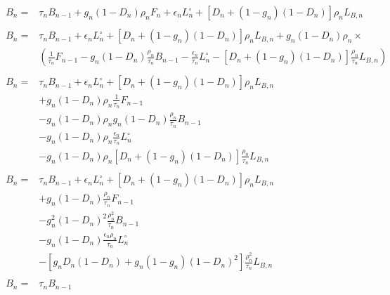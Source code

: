 \documentclass[11pt,a4paper]{article}
\begin{document}
\begin{align}
\begin{split}
	B_n = & \tau_n B_{n-1} + g_n \left(1 - D_n\right) \rho_n F_n + \epsilon_n L^\circ_n + \left[D_n + \left(1 - g_n\right)\left(1 - D_n\right)\right] \rho_n L_{B,n}
\end{split}\\
\begin{split}
	B_n = & \tau_n B_{n-1} + \epsilon_n L^\circ_n + \left[D_n + \left(1 - g_n\right)\left(1 - D_n\right)\right] \rho_n L_{B,n} + g_n \left(1 - D_n\right) \rho_n \times \\ &\left(\frac{1}{\tau_n} F_{n-1} - g_n \left(1 - D_n\right) \frac{\rho_n}{\tau_n} B_{n-1} - \frac{\epsilon_n}{\tau_n} L^\circ_n - \left[D_n + \left(1 - g_n\right)\left(1 - D_n\right)\right] \frac{\rho_n}{\tau_n} L_{B,n}\right)
\end{split}\\
\begin{split}
	B_n = & 
		\tau_n B_{n-1}
		+ \epsilon_n L^\circ_n
		+ \left[D_n + \left(1 - g_n\right)\left(1 - D_n\right)\right] \rho_n L_{B,n} \\&
		+ g_n \left(1 - D_n\right) \rho_n \frac{1}{\tau_n} F_{n-1} \\&
		- g_n \left(1 - D_n\right) \rho_n g_n \left(1 - D_n\right) \frac{\rho_n}{\tau_n} B_{n-1} \\&
		- g_n \left(1 - D_n\right) \rho_n \frac{\epsilon_n}{\tau_n} L^\circ_n \\&
		- g_n \left(1 - D_n\right) \rho_n \left[D_n + \left(1 - g_n\right)\left(1 - D_n\right)\right] \frac{\rho_n}{\tau_n} L_{B,n}
\end{split}\\
\begin{split}
	B_n = & 
		\tau_n B_{n-1}
		+ \epsilon_n L^\circ_n
		+ \left[D_n + \left(1 - g_n\right)\left(1 - D_n\right)\right] \rho_n L_{B,n} \\&
		+ g_n \left(1 - D_n\right) \frac{\rho_n}{\tau_n} F_{n-1} \\&
		- g_n^2 \left(1 - D_n\right)^2 \frac{\rho_n^2}{\tau_n} B_{n-1} \\&
		- g_n \left(1 - D_n\right) \frac{\epsilon_n \rho_n}{\tau_n} L^\circ_n \\&
		- \left[g_n D_n \left(1 - D_n\right) + g_n \left(1 - g_n\right) \left(1 - D_n\right)^2 \right] \frac{\rho_n^2}{\tau_n} L_{B,n}
\end{split}\\
\begin{split}
	B_n = & 
		\tau_n B_{n-1}

\end{split}
\end{align}
\end{document}
